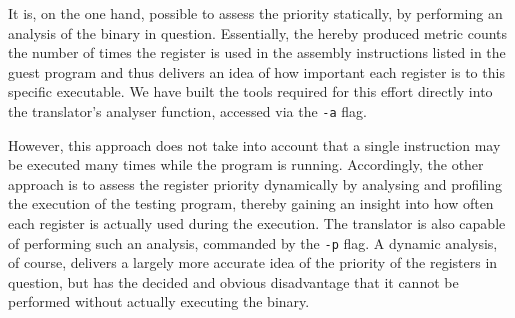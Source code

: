 It is, on the one hand, possible to assess the priority statically, by performing an analysis of the binary in question.
Essentially, the hereby produced metric counts the number of times the register is used in the assembly instructions listed in the guest program and thus delivers an idea of how important each register is to this specific executable.
We have built the tools required for this effort directly into the translator's analyser function, accessed via the \texttt{-a} flag.

However, this approach does not take into account that a single instruction may be executed many times while the program is running.
Accordingly, the other approach is to assess the register priority dynamically by analysing and profiling the execution of the testing program, thereby gaining an insight into how often each register is actually used during the execution.
The translator is also capable of performing such an analysis, commanded by the \texttt{-p} flag.
A dynamic analysis, of course, delivers a largely more accurate idea of the priority of the registers in question, but has the decided and obvious disadvantage that it cannot be performed without actually executing the binary.


